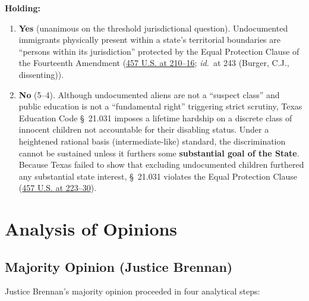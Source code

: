 \documentclass[12pt]{article}
\begin{document}
\textbf{Holding:}

\begin{enumerate}
    \item \textbf{Yes} (unanimous on the threshold jurisdictional question). Undocumented immigrants physically present within a state's territorial boundaries are ``persons within its jurisdiction'' protected by the Equal Protection Clause of the Fourteenth Amendment (\href{https://www.law.cornell.edu/supremecourt/text/457/202}{457 U.S. at 210--16}; \textit{id.}\ at 243 (Burger, C.J., dissenting)).
    \item \textbf{No} (5--4). Although undocumented aliens are not a ``suspect class'' and public education is not a ``fundamental right'' triggering strict scrutiny, Texas Education Code \S~21.031 imposes a lifetime hardship on a discrete class of innocent children not accountable for their disabling status. Under a heightened rational basis (intermediate-like) standard, the discrimination cannot be sustained unless it furthers some \textbf{substantial goal of the State}. Because Texas failed to show that excluding undocumented children furthered any substantial state interest, \S~21.031 violates the Equal Protection Clause (\href{https://www.law.cornell.edu/supremecourt/text/457/202}{457 U.S. at 223--30}).
\end{enumerate}

\section{Analysis of Opinions}
\subsection{Majority Opinion (Justice Brennan)}

Justice Brennan's majority opinion proceeded in four analytical steps:
\end{document}
